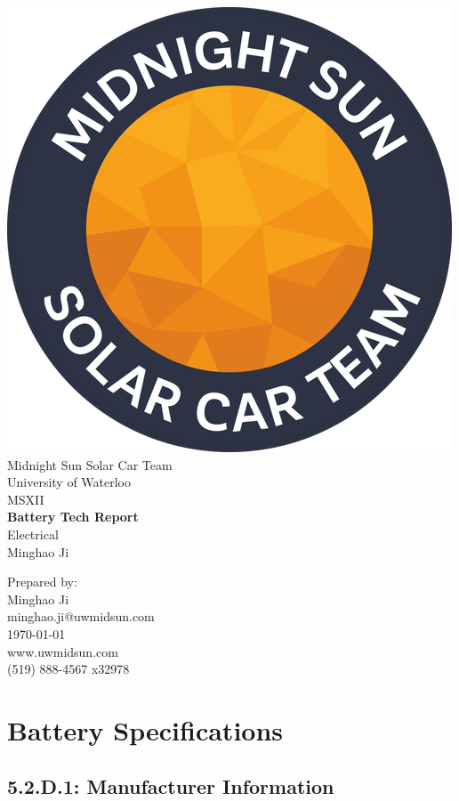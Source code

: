\documentclass[10pt]{article}
\makeatletter
\newcommand\theteamname{Midnight Sun Solar Car Team} %
\newcommand\theuniversityname{University of Waterloo} %
\newcommand\theteamwebsite{www.uwmidsun.com} %
\newcommand\theteamphone{(519) 888-4567 x32978} %
\newcommand\thetitle{Battery Tech Report} %
\newcommand\thesubtitle{Electrical} %
\newcommand\theauthor{Minghao Ji} %
\newcommand\theauthorcontact{minghao.ji@uwmidsun.com} %
\newcommand\thedate{\today} %
\makeatother
\begin{document}
\begin{titlepage}
\large
\vspace*{2cm}
\centering
\includegraphics[width=.25\textwidth]{./figures/midnightSunLogoCircle.png} \\
\vspace{1.5cm}
{\LARGE \theteamname} \\
\theuniversityname \\
\vspace{2.2cm}
{\LARGE MSXII} \\
\vspace{0.4cm}
{\huge\bfseries \thetitle} \\
\vspace{0.2cm}
{\LARGE \thesubtitle} \\
\vspace{2.2cm}
\ifdefined \theauthor
\par Prepared by: \\
\theauthor \\
\theauthorcontact \\
\fi
\thedate \\
\vfill
\theteamwebsite \\
\theteamphone
\end{titlepage}

\tableofcontents

\newpage

\section{Battery Specifications}

\subsection{5.2.D.1: Manufacturer Information}
\end{document}
